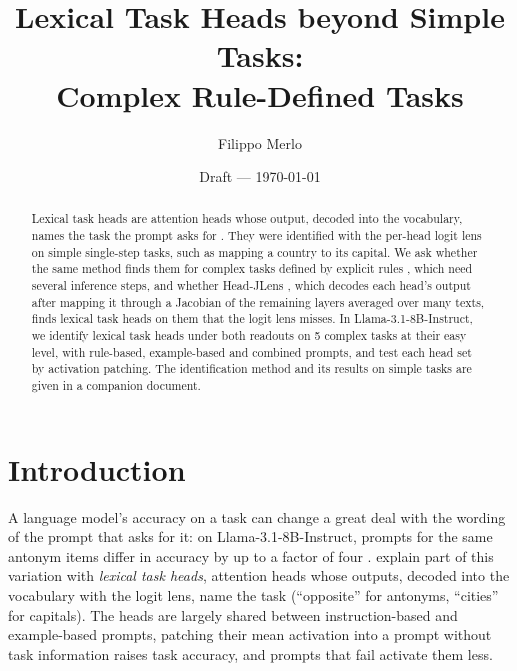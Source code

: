 \documentclass[11pt,a4paper]{article}
\title{Lexical Task Heads beyond Simple Tasks:\\ Complex Rule-Defined Tasks}
\author{Filippo Merlo}
\date{Draft --- \today}
\begin{document}
\maketitle

\begin{abstract}
\label{sec:abstract}
Lexical task heads are attention heads whose output, decoded into the vocabulary, names the task the prompt asks for \citep{yang2026shared}. They were identified with the per-head logit lens on simple single-step tasks, such as mapping a country to its capital. We ask whether the same method finds them for complex tasks defined by explicit rules \citep{fu2026rules}, which need several inference steps, and whether Head-JLens \citep{merlo2026headjlens}, which decodes each head's output after mapping it through a Jacobian of the remaining layers averaged over many texts, finds lexical task heads on them that the logit lens misses. In Llama-3.1-8B-Instruct, we identify lexical task heads under both readouts on 5 complex tasks at their easy level, with rule-based, example-based and combined prompts, and test each head set by activation patching. The identification method and its results on simple tasks are given in a companion document.
\end{abstract}

\section{Introduction}\label{sec:intro}
A language model's accuracy on a task can change a great deal with the wording of the prompt that asks for it: on Llama-3.1-8B-Instruct, prompts for the same antonym items differ in accuracy by up to a factor of four \citep[Fig.~1]{yang2026shared}. \citet{yang2026shared} explain part of this variation with \emph{lexical task heads}, attention heads whose outputs, decoded into the vocabulary with the logit lens, name the task (``opposite'' for antonyms, ``cities'' for capitals). The heads are largely shared between instruction-based and example-based prompts, patching their mean activation into a prompt without task information raises task accuracy, and prompts that fail activate them less.
\end{document}
